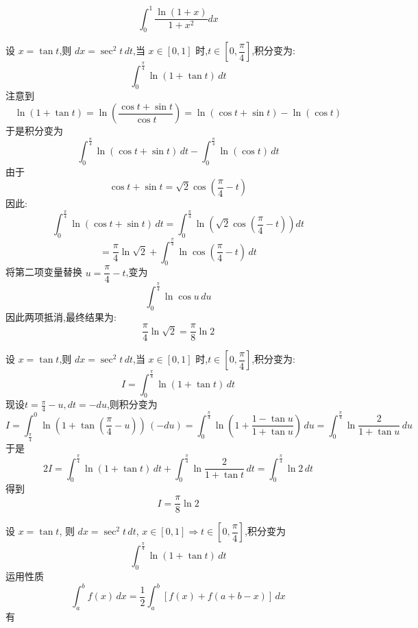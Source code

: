 \begin{questions}
    \question 
    \[
    \int_{0}^{1} \frac{\ln(1+x)}{1+x^2} dx
    \]
    \begin{solution}
        设 $x = \tan t$,则 $dx = \sec^2 t\, dt$,当 $x \in [0,1]$ 时,$t \in \left[0, \dfrac{\pi}{4}\right]$,积分变为:
        \[
        \int_0^{\frac{\pi}{4}} \ln(1 + \tan t) \, dt
        \]
        注意到
        \[
        \ln(1 + \tan t) = \ln\left( \frac{\cos t + \sin t}{\cos t} \right) = \ln(\cos t + \sin t) - \ln(\cos t)
        \]
        于是积分变为
        \[
        \int_0^{\frac{\pi}{4}} \ln(\cos t + \sin t)\, dt - \int_0^{\frac{\pi}{4}} \ln(\cos t)\, dt
        \]
        由于
        \[
        \cos t + \sin t = \sqrt{2} \cos\left( \frac{\pi}{4} - t \right)
        \]
        因此:
        \[
        \int_0^{\frac{\pi}{4}} \ln(\cos t + \sin t)\, dt = \int_0^{\frac{\pi}{4}} \ln\left( \sqrt{2} \cos\left( \frac{\pi}{4} - t \right) \right) dt
        \]
        \[
        = \frac{\pi}{4} \ln \sqrt{2} + \int_0^{\frac{\pi}{4}} \ln \cos\left( \frac{\pi}{4} - t \right)\, dt
        \]
        将第二项变量替换 $u = \dfrac{\pi}{4} - t$,变为
        \[
        \int_0^{\frac{\pi}{4}} \ln \cos u \, du
        \]
        因此两项抵消,最终结果为:
        \[
        \frac{\pi}{4} \ln \sqrt{2} = \frac{\pi}{8} \ln 2
        \]
    \end{solution}
    \begin{solution}
        设 $x = \tan t$,则 $dx = \sec^2 t\, dt$,当 $x \in [0,1]$ 时,$t \in \left[0, \dfrac{\pi}{4}\right]$,积分变为:
        \[
        I=\int_0^{\frac{\pi}{4}} \ln(1 + \tan t) \, dt
        \]
        现设$t=\frac{\pi}{4}-u,dt=-du$,则积分变为
        \[
        I=\int_{\frac{\pi}{4}}^0 \ln\left(1 + \tan \left(\frac{\pi}{4}-u\right)\right) \, (-du) 
        = \int_0^{\frac{\pi}{4}} \ln\left(1 + \frac{1-\tan u}{1+\tan u}\right) \, du
        = \int_0^{\frac{\pi}{4}} \ln\frac{2}{1+\tan u} \, du
        \]
        于是
        \[
        2I=\int_0^{\frac{\pi}{4}} \ln(1 + \tan t) \, dt+\int_0^{\frac{\pi}{4}} \ln\frac{2}{1+\tan t} \, dt = \int_0^{\frac{\pi}{4}} \ln 2 \, dt
        \]
        得到
        \[
        I=\frac{\pi}{8} \ln 2
        \]
    \end{solution}
    \begin{solution}
        设 $x = \tan t$, 则 $dx = \sec^2 t \, dt$, $x \in [0, 1] \Rightarrow t \in \left[0, \dfrac{\pi}{4}\right]$,积分变为
        \[
        \int_0^{\frac{\pi}{4}} \ln(1 + \tan t) \, dt
        \]
        运用性质
        \[
        \int_{a}^{b} f(x) \,dx = \frac{1}{2} \int_{a}^{b} [f(x) + f(a+b-x)] \,dx
        \]
        有
        \begin{align*}

\end{align*}
\end{solution}
\end{questions}
